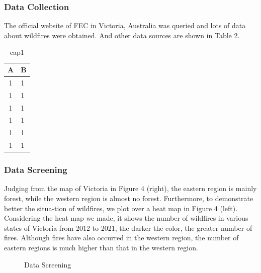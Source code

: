 \documentclass[12pt]{article}  %
\begin{document}
 \subsubsection{Data Collection}
 The official website of FEC in Victoria, Australia was queried and lots of data about wildfires were obtained. And other data sources are shown in Table 2.
 
 \begin{table}
 \centering
 \caption{cap1}
 \begin{tabular}{cl} 
 \hline
 A & \multicolumn{1}{c}{B}  \\ 
 \hline
 1 & 1                      \\
 1 & 1                      \\
 1 & 1                      \\
 1 & 1                      \\
 1 & 1                      \\
 1 & 1                      \\
 \hline
 \end{tabular}
 \end{table}
 
 \subsubsection{Data Screening}
 Judging from the map of Victoria in Figure 4 (right), the eastern region is mainly forest, while the western region is almost no forest. Furthermore, to demonstrate better the situa-tion of wildfires, we plot over a heat map in Figure 4 (left).
 Considering the heat map we made, it shows the number of wildfires in various states of Victoria from 2012 to 2021, the darker the color, the greater number of fires. Although fires have also occurred in the western region, the number of eastern regions is much higher than that in the western region. 
 
 \begin{figure}[htbp]
     \centering    
     \caption{Data Screening} %
 \end{figure}
 
\end{document}
